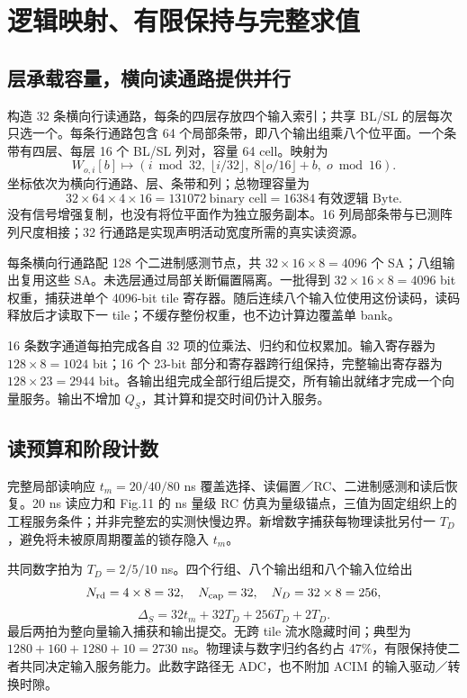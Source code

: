 \section{逻辑映射、有限保持与完整求值}

\subsection{层承载容量，横向读通路提供并行}
构造 32 条横向行读通路，每条的四层存放四个输入索引；共享 BL/SL 的层每次只选一个。每条行通路包含 64 个局部条带，即八个输出组乘八个位平面。一个条带有四层、每层 16 个 BL/SL 列对，容量 64 cell。映射为
\[
W_{o,i}[b]\longmapsto
(i\bmod32,\;\lfloor i/32\rfloor,\;8\lfloor o/16\rfloor+b,\;o\bmod16).
\]
坐标依次为横向行通路、层、条带和列；总物理容量为
\[
32\times64\times4\times16=131072\ \text{binary cell}
 =16384\ \text{有效逻辑 Byte}.
\]
没有信号增强复制，也没有将位平面作为独立服务副本。16 列局部条带与已测阵列尺度相接；32 行通路是实现声明活动宽度所需的真实读资源。

每条横向行通路配 128 个二进制感测节点，共 $32\times16\times8=4096$ 个 SA；八组输出复用这些 SA。未选层通过局部关断偏置隔离。一批得到 $32\times16\times8=4096$ bit 权重，捕获进单个 4096-bit tile 寄存器。随后连续八个输入位使用这份读码，读码释放后才读取下一 tile；不缓存整份权重，也不边计算边覆盖单 bank。

16 条数字通道每拍完成各自 32 项的位乘法、归约和位权累加。输入寄存器为 $128\times8=1024$ bit；16 个 23-bit 部分和寄存器跨行组保持，完整输出寄存器为 $128\times23=2944$ bit。各输出组完成全部行组后提交，所有输出就绪才完成一个向量服务。输出不增加 $Q_S$，其计算和提交时间仍计入服务。

\subsection{读预算和阶段计数}
完整局部读响应 $t_m=20/40/80$ ns 覆盖选择、读偏置／RC、二进制感测和读后恢复。20 ns 读应力和 Fig.11 的 ns 量级 RC 仿真为量级锚点，三值为固定组织上的工程服务条件；并非完整宏的实测快慢边界。新增数字捕获每物理读批另付一 $T_D$，避免将未被原周期覆盖的锁存隐入 $t_m$。

共同数字拍为 $T_D=2/5/10$ ns。四个行组、八个输出组和八个输入位给出
\[
N_{\rm rd}=4\times8=32,\quad N_{\rm cap}=32,\quad N_D=32\times8=256,
\]
\[
\boxed{\Delta_S=32t_m+32T_D+256T_D+2T_D.}
\]
最后两拍为整向量输入捕获和输出提交。无跨 tile 流水隐藏时间；典型为 $1280+160+1280+10=2730$ ns。物理读与数字归约各约占 47\%，有限保持使二者共同决定输入服务能力。此数字路径无 ADC，也不附加 ACIM 的输入驱动／转换时隙。

